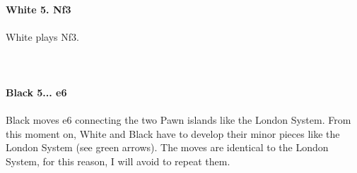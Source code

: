 \documentclass{article}
\begin{document}
\\
\\
\textbf{White 5. Nf3}\\
\\
White plays Nf3.\\
\\

\\
\\
\textbf{Black 5... e6}\\
\\
Black moves e6 connecting the two Pawn islands like the London System. From this moment on, White and Black have to develop their minor pieces like the London System (see green arrows). The moves are identical to the London System, for this reason, I will avoid to repeat them.\\
\end{document}

